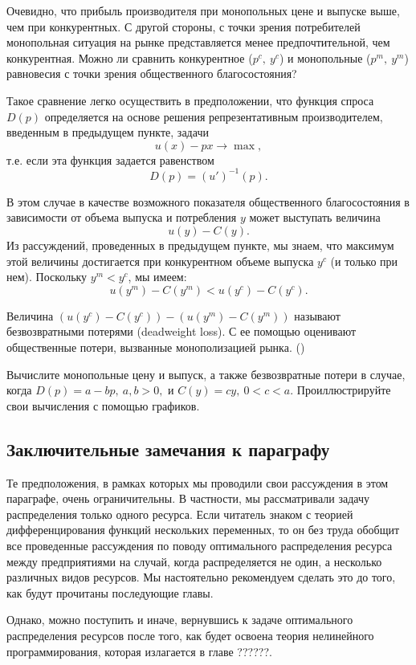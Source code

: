     Очевидно, что прибыль производителя при монопольных цене и выпуске
    выше, чем при конкурентных. С другой стороны, с точки зрения
    потребителей монопольная ситуация на рынке представляется менее
    предпочтительной, чем конкурентная. Можно ли сравнить конкурентное
    ($p^{c}, \ y^{c}$) и монопольные ($p^{m}, \ y^{m}$) равновесия
    с точки зрения общественного благосостояния?


    Такое сравнение легко осуществить в предположении, что функция
    спроса $D(p)$ определяется на основе решения
    репрезентативным производителем, введенным в предыдущем пункте, задачи
    \[u(x)-px\rightarrow\max,\]
    т.е. если эта функция задается равенством
    \[D(p)=(u')^{-1}(p).\]

    В этом случае в качестве возможного показателя общественного
    благосостояния в зависимости от объема  выпуска и потребления $y$
    может выступать величина
    \[u(y)-C(y).\]
    Из рассуждений, проведенных в предыдущем пункте, мы знаем, что
    максимум этой величины достигается при конкурентном объеме
    выпуска  $y^{c}$ (и только при нем). Поскольку $y^{m}<y^{c}$, мы имеем:
    \[u(y^{m})-C(y^{m})<u(y^{c})-C(y^{c}).\]


    Величина $(u(y^{c})-C(y^{c}))-(u(y^{m})-C(y^{m}))$
    называют безвозвратными потерями (deadweight loss). С ее помощью
    оценивают общественные потери, вызванные монополизацией рынка.
    ()

\begin{exer}
    Вычислите монопольные цену и выпуск, а также безвозвратные
    потери в случае, когда $D(p)=a-bp, \ a,b>0,$ и $C(y)=cy, \
    0<c<a$. Проиллюстрируйте свои вычисления с помощью графиков.
\end{exer}




\subsection{Заключительные замечания к параграфу}

    Те предположения, в рамках которых мы проводили свои рассуждения
    в этом параграфе, очень ограничительны. В частности, мы
    рассматривали задачу распределения только одного ресурса. Если
    читатель знаком с теорией дифференцирования функций нескольких
    переменных, то он без труда обобщит все проведенные рассуждения
    по поводу оптимального распределения ресурса между предприятиями
    на случай, когда распределяется не один,  а несколько различных
    видов ресурсов. Мы настоятельно рекомендуем сделать это до того,
    как будут прочитаны последующие главы.

    Однако, можно поступить и иначе, вернувшись к задаче
    оптимального распределения ресурсов после того, как будет
    освоена теория нелинейного программирования, которая излагается
    в главе ??????.
